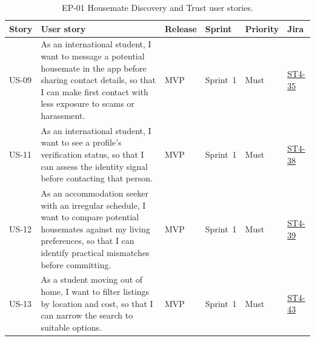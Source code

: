 \documentclass[11pt,a4paper]{article}
\begin{document}
\begin{table}[H]
    \centering
    \footnotesize
    \caption{EP-01 Housemate Discovery and Trust user stories.}
    \begin{tabularx}{\textwidth}{@{}L{1.05cm}Y L{1.75cm}L{1.7cm}L{1.2cm}L{1.1cm}@{}}
        \toprule
        Story & User story & Release & Sprint & Priority & Jira\\
        \midrule
        US-09 & As an international student, I want to message a potential housemate in the app before sharing contact details, so that I can make first contact with less exposure to scams or harassment. & MVP & Sprint~1 & Must & \href{https://unsw-team-desn-seng2026.atlassian.net/browse/ST4-35}{ST4-35}\\
        US-11 & As an international student, I want to see a profile's verification status, so that I can assess the identity signal before contacting that person. & MVP & Sprint~1 & Must & \href{https://unsw-team-desn-seng2026.atlassian.net/browse/ST4-38}{ST4-38}\\
        US-12 & As an accommodation seeker with an irregular schedule, I want to compare potential housemates against my living preferences, so that I can identify practical mismatches before committing. & MVP & Sprint~1 & Must & \href{https://unsw-team-desn-seng2026.atlassian.net/browse/ST4-39}{ST4-39}\\
        US-13 & As a student moving out of home, I want to filter listings by location and cost, so that I can narrow the search to suitable options. & MVP & Sprint~1 & Must & \href{https://unsw-team-desn-seng2026.atlassian.net/browse/ST4-43}{ST4-43}\\
        \bottomrule
    \end{tabularx}
    \label{tabstoriesep01}
\end{table}
\end{document}
